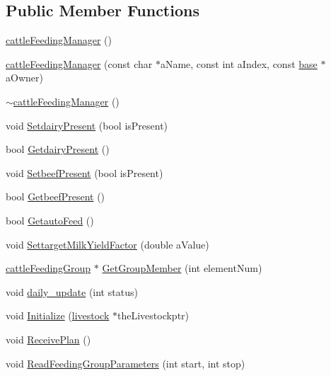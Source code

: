 \subsection*{Public Member Functions}
\begin{DoxyCompactItemize}
\item 
\hyperlink{classcattle_feeding_manager_ae91c55982c67f8bc983c545c2a624ce7}{cattleFeedingManager} ()
\item 
\hyperlink{classcattle_feeding_manager_aa1efdcaac1a2b1a6f5247287a8d3232d}{cattleFeedingManager} (const char $\ast$aName, const int aIndex, const \hyperlink{classbase}{base} $\ast$aOwner)
\item 
\hyperlink{classcattle_feeding_manager_a25bfea6e392a7097acfaafbdda189ff2}{$\sim$cattleFeedingManager} ()
\item 
void \hyperlink{classcattle_feeding_manager_a777a9ea05ff6bf97d301ebaea5661dc0}{SetdairyPresent} (bool isPresent)
\item 
bool \hyperlink{classcattle_feeding_manager_a58813fa005a5df26504c78c94c58ab0b}{GetdairyPresent} ()
\item 
void \hyperlink{classcattle_feeding_manager_a14e418c33839dc6e08048cff98197cd5}{SetbeefPresent} (bool isPresent)
\item 
bool \hyperlink{classcattle_feeding_manager_aee8f0f316a53c42ff846eab491f016d6}{GetbeefPresent} ()
\item 
bool \hyperlink{classcattle_feeding_manager_a07d92795c4670674abbaa0be7b07814d}{GetautoFeed} ()
\item 
void \hyperlink{classcattle_feeding_manager_a45e8328242ab6930b4b3c1fd08fb16af}{SettargetMilkYieldFactor} (double aValue)
\item 
\hyperlink{classcattle_feeding_group}{cattleFeedingGroup} $\ast$ \hyperlink{classcattle_feeding_manager_ade13c39fd50aca07ec357f1a3dbaff2f}{GetGroupMember} (int elementNum)
\item 
void \hyperlink{classcattle_feeding_manager_a655795278b3ca1e7511f6c40c29e2e0c}{daily\_\-update} (int status)
\item 
void \hyperlink{classcattle_feeding_manager_aab4f3ceb55336198695404d5a32018ba}{Initialize} (\hyperlink{classlivestock}{livestock} $\ast$theLivestockptr)
\item 
void \hyperlink{classcattle_feeding_manager_a2e4bb44d555d13f9ebb0b960517de172}{ReceivePlan} ()
\item 
void \hyperlink{classcattle_feeding_manager_aa1204eac6b3850b06e7b5b1a0f54cacc}{ReadFeedingGroupParameters} (int start, int stop)

\end{DoxyCompactItemize}
